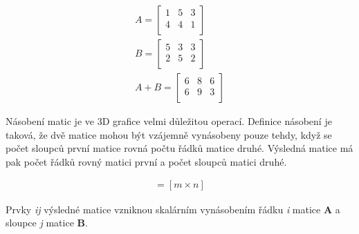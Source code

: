 \begin{align}
 A = \begin{bmatrix}
       1 & 5 & 3 \\[0.3em]
       4 & 4 & 1 \\[0.3em]
     \end{bmatrix} \\
 B = \begin{bmatrix}
       5 & 3 & 3 \\[0.3em]
       2 & 5 & 2 \\[0.3em]
     \end{bmatrix} \\
 A + B = \begin{bmatrix}
       6 & 8 & 6 \\[0.3em]
       6 & 9 & 3 \\[0.3em]
     \end{bmatrix}
\end{align}

Násobení matic je ve 3D grafice velmi důležitou operací. Definice násobení je taková, že dvě matice mohou být vzájemně vynásobeny pouze tehdy, když se počet sloupců první matice rovná počtu řádků matice druhé. Výsledná matice má pak počet řádků rovný matici první a počet sloupců matici druhé.

\begin{align}
[m \times p][p \times n] = [m \times n]
\end{align}

Prvky \textit{ij} výsledné matice vzniknou skalárním vynásobením řádku \textit{i} matice \textbf{A} a sloupce \textit{j} matice \textbf{B}.

